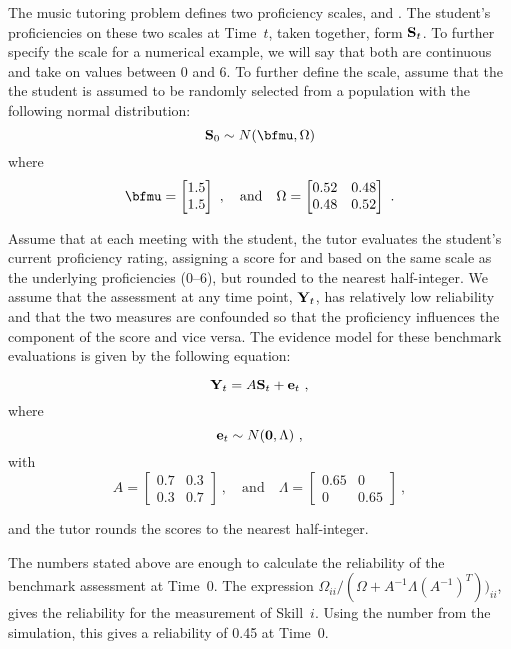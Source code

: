 \documentclass[12pt]{RR-article}
\begin{document}
The music tutoring problem defines two proficiency scales,
 and .  The student's proficiencies on
these two scales at Time~$t$, taken together, form ${\bf S}_t$.  To
further specify the scale for a numerical example, we will say that
both are continuous and take on values between 0 and 6.  To further
define the scale, assume that the the student is assumed to be
randomly selected from a population with the following normal
distribution:
\[
{\bf S}_0 \sim N (\bfmu, \Omega)
\]
where 
\[
  \bfmu = \left [ \begin{matrix}
     1.5 \\ 1.5
  \end{matrix} \right ] \ , 
\quad\mbox{and} \quad
  \Omega = \left [ \begin{matrix}
   0.52 & 0.48 \\ 0.48 & 0.52
  \end{matrix} \right ]  
\ .
\] 

Assume that at each meeting with the student, the tutor evaluates
the student's current proficiency rating, assigning a score for
 and  based on the same scale as the
underlying proficiencies (0--6), but rounded to the nearest
half-integer.  We assume that the assessment at any time point, ${\bf 
Y}_t$, has relatively low reliability and that the two measures are
confounded so that the  proficiency influences the
 component of the score and vice versa.  The evidence
model for these benchmark evaluations is given by the following
equation:

\begin{equation}
\label{eq:muEM}
{\bf Y}_t = A {\bf S}_t  + {\bf e}_t\ ,
\end{equation}
where
\[
{\bf e}_t \sim N ({\bf 0}, \Lambda) \ ,
\]
with
\[
A =   \left [ \begin{matrix}
   0.7 & 0.3 \\ 0.3 & 0.7
  \end{matrix} \right ]  \ ,
\quad\mbox{and}\quad
\Lambda =
  \left [ \begin{matrix}
   0.65 & 0 \\ 0 & 0.65
  \end{matrix} \right ]  \ ,
\]

and the tutor rounds the scores to the nearest half-integer.  

The numbers stated above are enough to calculate the reliability of
the benchmark assessment at Time~0.  The expression
$\Omega_{ii}/(\Omega + A^{-1}\Lambda (A^{-1})^{T}))_{ii}$, gives the
reliability for the measurement of Skill~$i$.  Using the
number from the simulation, this gives a reliability of 0.45 at Time~0.  
\end{document}
